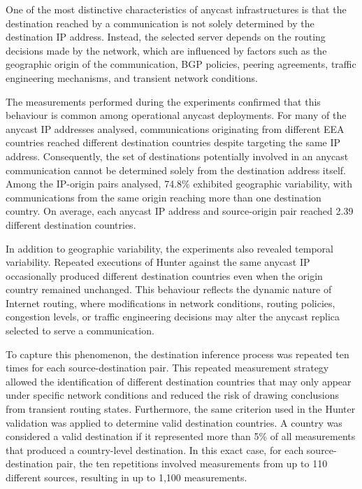 \documentclass[
A4paper,                %
twoside,                %
openright,              %
chapterprefix=true,     %
12pt,                   %
headings=normal,        %
titlepage=on            %
]{book}
\begin{document}
One of the most distinctive characteristics of anycast infrastructures is that the destination reached by a communication is not solely determined by the destination IP address. Instead, the selected server depends on the routing decisions made by the network, which are influenced by factors such as the geographic origin of the communication, BGP policies, peering agreements, traffic engineering mechanisms, and transient network conditions.

The measurements performed during the experiments confirmed that this behaviour is common among operational anycast deployments. For many of the anycast IP addresses analysed, communications originating from different EEA countries reached different destination countries despite targeting the same IP address. Consequently, the set of destinations potentially involved in an anycast communication cannot be determined solely from the destination address itself. Among the IP-origin pairs analysed, 74.8\% exhibited geographic variability, with communications from the same origin reaching more than one destination country. On average, each anycast IP address and source-origin pair reached 2.39 different destination countries.

In addition to geographic variability, the experiments also revealed temporal variability. Repeated executions of Hunter against the same anycast IP occasionally produced different destination countries even when the origin country remained unchanged. This behaviour reflects the dynamic nature of Internet routing, where modifications in network conditions, routing policies, congestion levels, or traffic engineering decisions may alter the anycast replica selected to serve a communication.

To capture this phenomenon, the destination inference process was repeated ten times for each source-destination pair. This repeated measurement strategy allowed the identification of different destination countries that may only appear under specific network conditions and reduced the risk of drawing conclusions from transient routing states. Furthermore, the same criterion used in the Hunter validation was applied to determine valid destination countries. A country was considered a valid destination if it represented more than 5\% of all measurements that produced a country-level destination. In this exact case, for each source-destination pair, the ten repetitions involved measurements from up to 110 different sources, resulting in up to 1,100 measurements.
\end{document}
